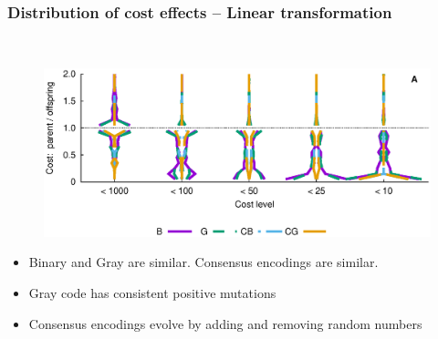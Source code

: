 \documentclass{beamer}
\theoremstyle{plain}
\theoremstyle{definition}
\begin{document}
\begin{frame}
   \frametitle{Distribution of cost effects -- Linear transformation}
   \vspace{2cm}
   \hspace{-4cm}~\begin{figure}
      \hspace{-4.5em}
      \includegraphics[trim=0 4cm 0 0,scale=.65]{linear_histo}
      \hspace{-4em}
   \end{figure}
   \vspace{-4cm}
   \begin{itemize}
      \item Binary and Gray are similar. Consensus encodings are similar.
      \item Gray code has consistent positive mutations
      \item Consensus encodings evolve by adding and removing random numbers
   \end{itemize}
\end{frame}
\end{document}
